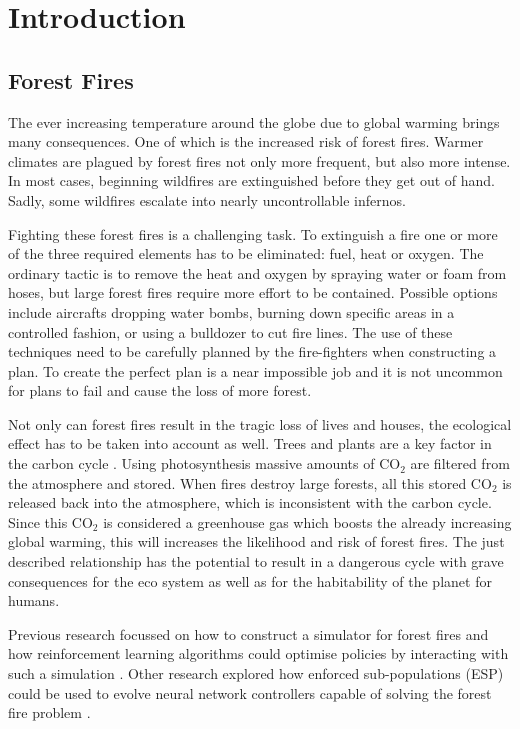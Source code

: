 
\section{Introduction}\label{sec:introduction}

\subsection{Forest Fires}
The ever increasing temperature around the globe due to global warming brings many consequences. One of which is the increased risk of forest fires. Warmer climates are plagued by forest fires not only more frequent, but also more intense.  In most cases, beginning wildfires are extinguished before they get out of hand. Sadly, some wildfires escalate into nearly uncontrollable infernos.

Fighting these forest fires is a challenging task. To extinguish a fire one or more of the three required elements has to be eliminated: fuel, heat or oxygen. The ordinary tactic is to remove the heat and oxygen by spraying water or foam from hoses, but large forest fires require more effort to be contained. Possible options include aircrafts dropping water bombs, burning down specific areas in a controlled fashion, or using a bulldozer to cut fire lines. The use of these techniques need to be carefully planned by the fire-fighters when constructing a plan. To create the perfect plan is a near impossible job and it is not uncommon for plans to fail and cause the loss of more forest.

Not only can forest fires result in the tragic loss of lives and houses, the ecological effect has to be taken into account as well. Trees and plants are a key factor in the carbon cycle \citep{kasischke1995fire}. Using photosynthesis massive amounts of CO$_{2}$ are filtered from the atmosphere and stored. When fires destroy large forests, all this stored CO$_{2}$ is released back into the atmosphere, which is inconsistent with the carbon cycle. Since this CO$_{2}$ is considered a greenhouse gas \citep{houghton1991climate} which boosts the already increasing global warming, this will increases the likelihood and risk of forest fires. The just described relationship has the potential to result in a dangerous cycle with grave consequences for the eco system as well as for the habitability of the planet for humans.

Previous research focussed on how to construct a simulator for forest fires and how reinforcement learning algorithms could optimise policies by interacting with such a simulation \citep{wiering1998learning}. Other research explored how enforced sub-populations (ESP) could be used to evolve neural network controllers capable of solving the forest fire problem \citep{wiering2005evolving}.


